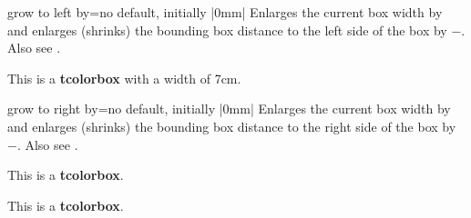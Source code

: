 \clearpage
\begin{docTcbKey}{grow to left by}{=}{no default, initially |0mm|}
  Enlarges the current box width by  and
  enlarges (shrinks) the bounding box distance to the left side of the box by
  $-$. Also see .
\begin{dispExample}

\begin{tcolorbox}[width=5cm,grow to left by=2cm,enhanced,show bounding box]
This is a \textbf{tcolorbox} with a width of 7cm.
\end{tcolorbox}
\end{dispExample}
\end{docTcbKey}

\begin{docTcbKey}{grow to right by}{=}{no default, initially |0mm|}
  Enlarges the current box width by  and
  enlarges (shrinks) the bounding box distance to the right side of the box by
  $-$. Also see .
\begin{dispExample}

\begin{tcolorbox}[grow to right by=2cm,enhanced,show bounding box]
This is a \textbf{tcolorbox}.
\end{tcolorbox}

\bigskip

\begin{tcolorbox}[grow to right by=2cm,grow to left by=1cm,
  enhanced,show bounding box]
This is a \textbf{tcolorbox}.
\end{tcolorbox}

\end{dispExample}
\end{docTcbKey}


